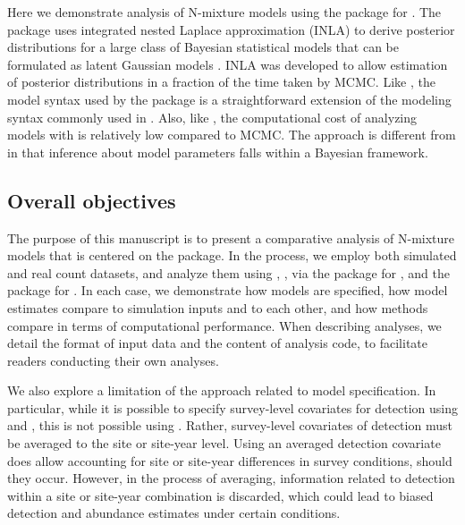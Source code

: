 \documentclass[codesnippet]{jss}
\begin{document}
Here we demonstrate analysis of N-mixture models using the  package  \citep{Martins_Simpson_Lindgren_Rue_2013,Rue_Riebler_Sorbye_Illian_Simpson_Lindgren_2017} for . The  package uses integrated nested Laplace approximation (INLA) to derive posterior distributions for a large class of Bayesian statistical models that can be formulated as latent Gaussian models  \citep{Rue_Martino_Chopin_2009, Lindgren_Rue_Lindstrom_2011}. INLA was developed to allow estimation of posterior distributions in a fraction of the time taken by MCMC. Like , the model syntax used by the  package is a straightforward extension of the modeling syntax commonly used in . Also, like , the computational cost of analyzing models with  is relatively low compared to MCMC. The  approach is different from  in that inference about model parameters falls within a Bayesian framework.

\subsection[Overall objectives]{Overall objectives}
The purpose of this manuscript is to present a comparative analysis of N-mixture models that is centered on the  package. In the process, we employ both simulated and real count datasets, and analyze them using , , via the  package \citep{Denwood_2016} for , and the  package for . In each case, we demonstrate how models are specified, how model estimates compare to simulation inputs and to each other, and how methods compare in terms of computational performance. When describing  analyses, we detail the format of input data and the content of analysis code, to facilitate readers conducting their own analyses.

We also explore a limitation of the  approach related to model specification. In particular, while it is possible to specify survey-level covariates for detection using  and , this is not possible using . Rather, survey-level covariates of detection must be averaged to the site or site-year level. Using an averaged detection covariate does allow accounting for site or site-year differences in survey conditions, should they occur. However, in the process of averaging, information related to detection within a site or site-year combination is discarded, which could lead to biased detection and abundance estimates under certain conditions.
\end{document}
